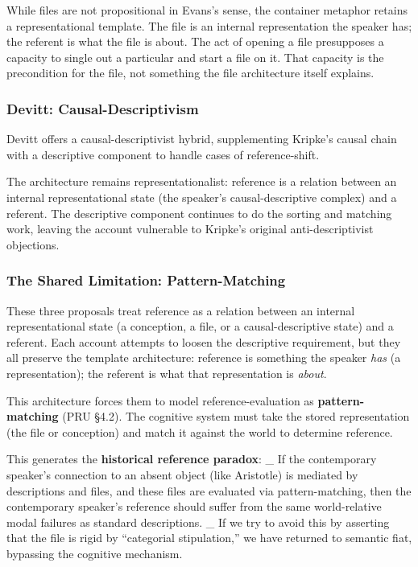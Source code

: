 \documentclass[12pt,a4paper]{article}
\begin{document}
While files are not propositional in Evans's sense, the container metaphor retains a representational template. The file is an internal representation the speaker has; the referent is what the file is about. The act of opening a file presupposes a capacity to single out a particular and start a file on it. That capacity is the precondition for the file, not something the file architecture itself explains.

\subsubsection{Devitt: Causal-Descriptivism}\label{devitt-causal-descriptivism}

Devitt offers a causal-descriptivist hybrid, supplementing Kripke's causal chain with a descriptive component to handle cases of reference-shift.

The architecture remains representationalist: reference is a relation between an internal representational state (the speaker's causal-descriptive complex) and a referent. The descriptive component continues to do the sorting and matching work, leaving the account vulnerable to Kripke's original anti-descriptivist objections.

\subsubsection{The Shared Limitation: Pattern-Matching}\label{the-shared-limitation-pattern-matching}

These three proposals treat reference as a relation between an internal representational state (a conception, a file, or a causal-descriptive state) and a referent. Each account attempts to loosen the descriptive requirement, but they all preserve the template architecture: reference is something the speaker \emph{has} (a representation); the referent is what that representation is \emph{about}.

This architecture forces them to model reference-evaluation as \textbf{pattern-matching} (PRU §4.2). The cognitive system must take the stored representation (the file or conception) and match it against the world to determine reference.

This generates the \textbf{historical reference paradox}: \_ If the contemporary speaker's connection to an absent object (like Aristotle) is mediated by descriptions and files, and these files are evaluated via pattern-matching, then the contemporary speaker's reference should suffer from the same world-relative modal failures as standard descriptions. \_ If we try to avoid this by asserting that the file is rigid by ``categorial stipulation,'' we have returned to semantic fiat, bypassing the cognitive mechanism.
\end{document}

